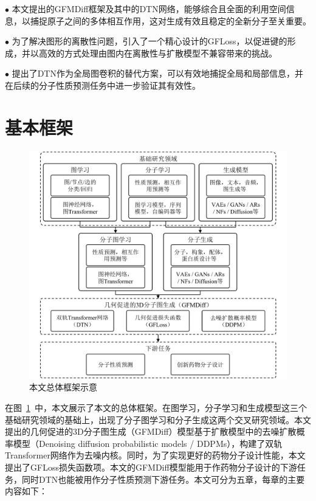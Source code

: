 $\bullet$ 本文提出的GFMDiff框架及其中的DTN网络，能够综合且全面的利用空间信息，以捕捉原子之间的多体相互作用，这对生成有效且稳定的全新分子至关重要。

$\bullet$ 为了解决图形的离散性问题，引入了一个精心设计的GFLoss，以促进键的形成，并以高效的方式处理由图内在离散性与扩散模型不兼容带来的挑战。

$\bullet$ 提出了DTN作为全局图卷积的替代方案，可以有效地捕捉全局和局部信息，并在后续的分子性质预测任务中进一步验证其有效性。

\section{基本框架}
\begin{figure}[h]
    \centering
    \includegraphics[width=\linewidth]{figures/overall_structure.png}
    \caption{本文总体框架示意}
    \label{fig:oa_struc}
  \end{figure}

在图~\ref{fig:oa_struc}~中，本文展示了本文的总体框架。在图学习，分子学习和生成模型这三个基础研究领域的基础上，出现了分子图学习和分子生成这两个交叉研究领域。本文提出的几何促进的3D分子图生成（GFMDiff）模型基于扩散模型中的去噪扩散概率模型（Denoising diffusion probabilistic models / DDPMs），构建了双轨Transformer网络作为去噪内核。同时，为了实现更好的药物分子设计性能，本文提出了GFLoss损失函数项。本文的GFMDiff模型能用于作药物分子设计的下游任务，同时DTN也能被用作分子性质预测下游任务。本文可分为五章，每章的主要内容如下：

